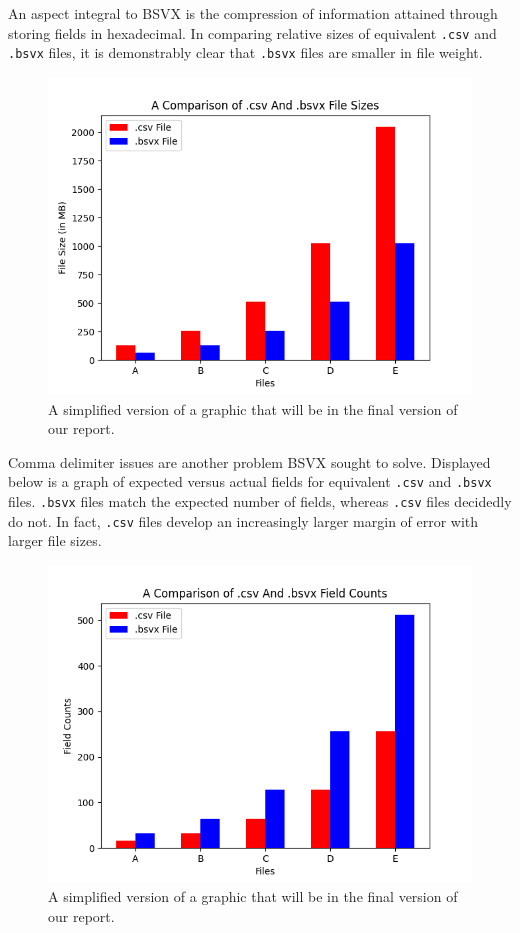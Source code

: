 \documentclass[10pt]{article}
\begin{document}
\indent{}
An aspect integral to BSVX is the compression of information attained through storing fields in hexadecimal.
In comparing relative sizes of equivalent \texttt{.csv} and \texttt{.bsvx} files, it is demonstrably clear that \texttt{.bsvx} files are smaller in file weight.

\begin{figure}[H]
\centering
\includegraphics[width=5in]{scripts/figures/1.png}
\caption{A simplified version of a graphic that will be in the final version of our report.}
\label{fig:results_1}
\end{figure}

\indent{}
Comma delimiter issues are another problem BSVX sought to solve.
Displayed below is a graph of expected versus actual fields for equivalent \texttt{.csv} and \texttt{.bsvx} files.
\texttt{.bsvx} files match the expected number of fields, whereas \texttt{.csv} files decidedly do not.
In fact, \texttt{.csv} files develop an increasingly larger margin of error with larger file sizes.

\begin{figure}[H]
\centering
\includegraphics[width=5in]{scripts/figures/2.png}
\caption{A simplified version of a graphic that will be in the final version of our report.}
\label{fig:results_2}
\end{figure}
\end{document}
